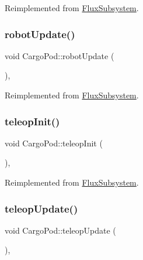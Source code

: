 Reimplemented from \hyperlink{classFluxSubsystem_aacd5ddfcadda0866d5e838de09a60d63}{Flux\+Subsystem}.

\mbox{\label{classCargoPod_a22723a1f9685242aca13e6bc44e3f0a2}} 
\subsubsection{\texorpdfstring{robot\+Update()}{robotUpdate()}}
{\footnotesize\ttfamily void Cargo\+Pod\+::robot\+Update (\begin{DoxyParamCaption}{ }\end{DoxyParamCaption})\hspace{0.3cm}{\ttfamily [override]}, {\ttfamily [virtual]}}



Reimplemented from \hyperlink{classFluxSubsystem_ac2b1c08b53251870e945edf7080c1549}{Flux\+Subsystem}.

\mbox{\label{classCargoPod_a2da82d2620414330cd775ac1c7f0718a}} 
\subsubsection{\texorpdfstring{teleop\+Init()}{teleopInit()}}
{\footnotesize\ttfamily void Cargo\+Pod\+::teleop\+Init (\begin{DoxyParamCaption}{ }\end{DoxyParamCaption})\hspace{0.3cm}{\ttfamily [override]}, {\ttfamily [virtual]}}



Reimplemented from \hyperlink{classFluxSubsystem_aec6d05e4f80c3783684598fb92ad2e55}{Flux\+Subsystem}.

\mbox{\label{classCargoPod_a29fd74f10b26e3db4348e039969fb173}} 
\subsubsection{\texorpdfstring{teleop\+Update()}{teleopUpdate()}}
{\footnotesize\ttfamily void Cargo\+Pod\+::teleop\+Update (\begin{DoxyParamCaption}{ }\end{DoxyParamCaption})\hspace{0.3cm}{\ttfamily [override]}, {\ttfamily [virtual]}}



